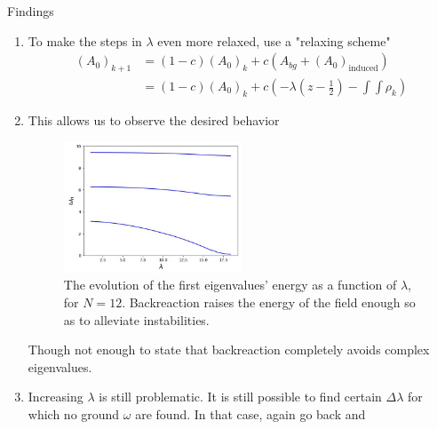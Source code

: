 \begin{frame}[allowframebreaks]{Findings}
\begin{enumerate}
\begin{enumerate}
			\end{enumerate}
		\item To make the steps in $\lambda$ even more relaxed, use a "relaxing scheme" 
		\begin{align}
			\left( A_0 \right) _{k+1} &= (1-c) (A_0)_k + c ( A_{bg} + \left( A_0 \right) _{\text{induced}}) \\
						  &= (1-c) (A_0)_k + c ( -\lambda \left( z-\frac{1}{2} \right) - \int\int \rho_k) 
		\end{align}
	\item This allows us to observe the desired behavior
		\begin{figure}[h]
			\centering
			\includegraphics[width=0.5\textwidth]{figures/eigenvalue-evolution.png}
			\caption{The evolution of the first eigenvalues' energy as a function of $\lambda$, for $N = 12$. Backreaction raises the energy of the field enough so as to alleviate instabilities.}
			\label{fig:figures-eigenvalue-evolution-png}
		\end{figure}
		Though not enough to state that backreaction completely avoids complex eigenvalues.

	\item Increasing $\lambda$ is still problematic. It is still possible to find certain $\Delta \lambda$ for which no ground $\omega$ are found. In that case, again go back and 
			\end{enumerate}


		\end{frame}
